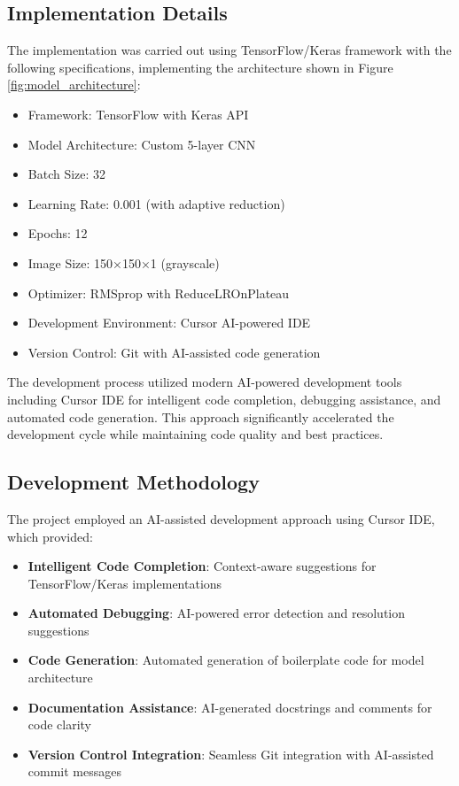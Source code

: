 \documentclass[conference]{IEEEtran}
\begin{document}
\subsection{Implementation Details}
The implementation was carried out using TensorFlow/Keras framework with the following specifications, implementing the architecture shown in Figure \ref{fig:model_architecture}:
\begin{itemize}
    \item Framework: TensorFlow with Keras API
    \item Model Architecture: Custom 5-layer CNN
    \item Batch Size: 32
    \item Learning Rate: 0.001 (with adaptive reduction)
    \item Epochs: 12
    \item Image Size: 150×150×1 (grayscale)
    \item Optimizer: RMSprop with ReduceLROnPlateau
    \item Development Environment: Cursor AI-powered IDE
    \item Version Control: Git with AI-assisted code generation
\end{itemize}

The development process utilized modern AI-powered development tools including Cursor IDE for intelligent code completion, debugging assistance, and automated code generation. This approach significantly accelerated the development cycle while maintaining code quality and best practices.

\subsection{Development Methodology}
The project employed an AI-assisted development approach using Cursor IDE, which provided:
\begin{itemize}
    \item \textbf{Intelligent Code Completion}: Context-aware suggestions for TensorFlow/Keras implementations
    \item \textbf{Automated Debugging}: AI-powered error detection and resolution suggestions
    \item \textbf{Code Generation}: Automated generation of boilerplate code for model architecture
    \item \textbf{Documentation Assistance}: AI-generated docstrings and comments for code clarity
    \item \textbf{Version Control Integration}: Seamless Git integration with AI-assisted commit messages
\end{itemize}
\end{document}
